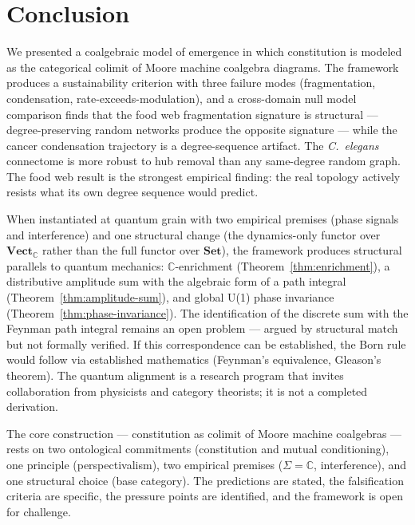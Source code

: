 \documentclass[12pt,a4paper]{article}
\begin{document}
\section{Conclusion}
\label{sec:conclusion}

We presented a coalgebraic model of emergence in which constitution is modeled as the categorical colimit of Moore machine coalgebra diagrams. The framework produces a sustainability criterion with three failure modes (fragmentation, condensation, rate-exceeds-modulation), and a cross-domain null model comparison finds that the food web fragmentation signature is structural --- degree-preserving random networks produce the opposite signature --- while the cancer condensation trajectory is a degree-sequence artifact. The \textit{C.~elegans} connectome is more robust to hub removal than any same-degree random graph. The food web result is the strongest empirical finding: the real topology actively resists what its own degree sequence would predict.

When instantiated at quantum grain with two empirical premises (phase signals and interference) and one structural change (the dynamics-only functor over $\mathbf{Vect}_{\mathbb{C}}$ rather than the full functor over $\mathbf{Set}$), the framework produces structural parallels to quantum mechanics: $\mathbb{C}$-enrichment (Theorem~\ref{thm:enrichment}), a distributive amplitude sum with the algebraic form of a path integral (Theorem~\ref{thm:amplitude-sum}), and global U(1) phase invariance (Theorem~\ref{thm:phase-invariance}). The identification of the discrete sum with the Feynman path integral remains an open problem --- argued by structural match but not formally verified. If this correspondence can be established, the Born rule would follow via established mathematics (Feynman's equivalence, Gleason's theorem). The quantum alignment is a research program that invites collaboration from physicists and category theorists; it is not a completed derivation.

The core construction --- constitution as colimit of Moore machine coalgebras --- rests on two ontological commitments (constitution and mutual conditioning), one principle (perspectivalism), two empirical premises ($\Sigma = \mathbb{C}$, interference), and one structural choice (base category). The predictions are stated, the falsification criteria are specific, the pressure points are identified, and the framework is open for challenge.
\end{document}

